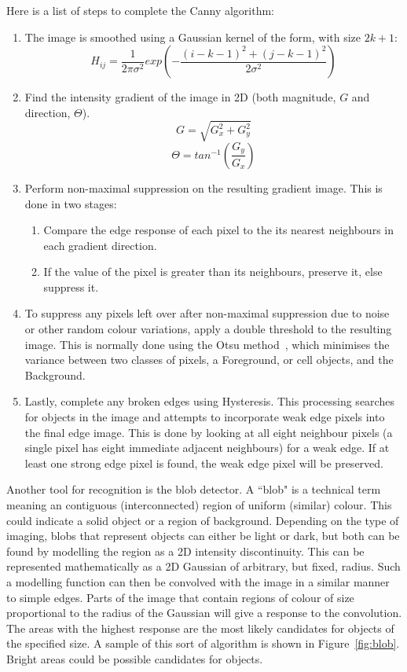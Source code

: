 Here is a list of steps to complete the Canny algorithm:
\begin{enumerate}
	\item The image is smoothed using a Gaussian kernel of the form, with size $2k + 1$:
	\begin{equation}
	H_{ij} = \frac{1}{2 \pi \sigma^2} exp \left( -\frac{(i - k - 1)^2 + (j - k - 1)^2}{2 \sigma^2} \right)
	\end{equation}
	\item Find the intensity gradient of the image in 2D (both magnitude, $G$ and direction, $\Theta$).
	\begin{equation}
	G = \sqrt{G^2_x + G^2_y}
	\end{equation}
	\begin{equation}
	\Theta = tan^{-1} (\frac{G_y}{G_x})
	\end{equation}
	\item Perform non-maximal suppression on the resulting gradient image. This is done in two stages:
	\begin{enumerate}
		\item Compare the edge response of each pixel to the its nearest neighbours in each gradient direction.
		\item If the value of the pixel is greater than its neighbours, preserve it, else suppress it.
	\end{enumerate}
	\item To suppress any pixels left over after non-maximal suppression due to noise or other random colour variations, apply a double threshold to the resulting image. This is normally done using the Otsu method~\cite{Liao:01}, which minimises the variance between two classes of pixels, a Foreground, or cell objects, and the Background.
	\item Lastly, complete any broken edges using Hysteresis. This processing searches for objects in the image and attempts to incorporate weak edge pixels into the final edge image. This is done by looking at all eight neighbour pixels (a single pixel has eight immediate adjacent neighbours) for a weak edge. If at least one strong edge pixel is found, the weak edge pixel will be preserved.
\end{enumerate}

Another tool for recognition is the blob detector. A ``blob" is a technical term meaning an contiguous (interconnected) region of uniform (similar) colour. This could indicate a solid object or a region of background. Depending on the type of imaging, blobs that represent objects can either be light or dark, but both can be found by modelling the region as a 2D intensity discontinuity. This can be represented mathematically as a 2D Gaussian of arbitrary, but fixed, radius. Such a modelling function can then be convolved with the image in a similar manner to simple edges. Parts of the image that contain regions of colour of size proportional to the radius of the Gaussian will give a response to the convolution. The areas with the highest response are the most likely candidates for objects of the specified size. A sample of this sort of algorithm is shown in Figure~\ref{fig:blob}. Bright areas could be possible candidates for objects.

